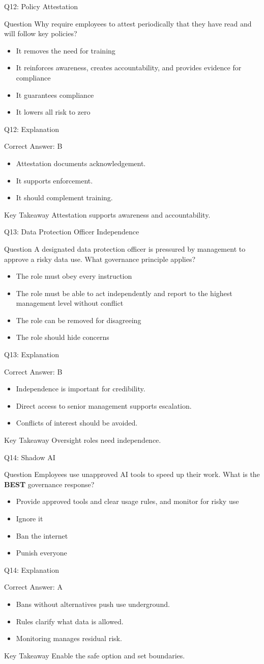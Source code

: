 \documentclass[aspectratio=169]{beamer}
\newcommand{\hq}[7]{%
	\begin{frame}{Q#1: #2}
		\begin{block}{Question}
			#3
		\end{block}
		\begin{itemize}
			#4
		\end{itemize}
	\end{frame}
	\begin{frame}{Q#1: Explanation}
		\begin{block}{Correct Answer: #5}
			\begin{itemize}
				#6
			\end{itemize}
		\end{block}
		\begin{alertblock}{Key Takeaway}
			#7
		\end{alertblock}
	\end{frame}
}
\begin{document}
	\hq{12}{Policy Attestation}
	{Why require employees to attest periodically that they have read and will follow key policies?}
	{\item[\textbf{(A)}] It removes the need for training
		\item[\textbf{(B)}] It reinforces awareness, creates accountability, and provides evidence for compliance
		\item[\textbf{(C)}] It guarantees compliance
		\item[\textbf{(D)}] It lowers all risk to zero}
	{B}
	{\item Attestation documents acknowledgement.
		\item It supports enforcement.
		\item It should complement training.}
	{Attestation supports awareness and accountability.}

	\hq{13}{Data Protection Officer Independence}
	{A designated data protection officer is pressured by management to approve a risky data use. What governance principle applies?}
	{\item[\textbf{(A)}] The role must obey every instruction
		\item[\textbf{(B)}] The role must be able to act independently and report to the highest management level without conflict
		\item[\textbf{(C)}] The role can be removed for disagreeing
		\item[\textbf{(D)}] The role should hide concerns}
	{B}
	{\item Independence is important for credibility.
		\item Direct access to senior management supports escalation.
		\item Conflicts of interest should be avoided.}
	{Oversight roles need independence.}

	\hq{14}{Shadow AI}
	{Employees use unapproved AI tools to speed up their work. What is the \textbf{BEST} governance response?}
	{\item[\textbf{(A)}] Provide approved tools and clear usage rules, and monitor for risky use
		\item[\textbf{(B)}] Ignore it
		\item[\textbf{(C)}] Ban the internet
		\item[\textbf{(D)}] Punish everyone}
	{A}
	{\item Bans without alternatives push use underground.
		\item Rules clarify what data is allowed.
		\item Monitoring manages residual risk.}
	{Enable the safe option and set boundaries.}
\end{document}
